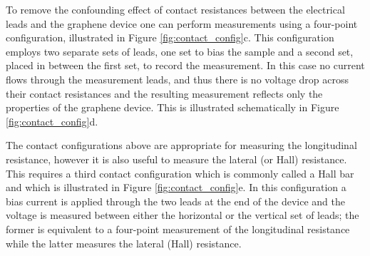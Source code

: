 \documentclass[edeposit,fullpage,draftthesis]{uiucthesis2009}
\begin{document}
            To remove the confounding effect of contact resistances between the electrical leads and the graphene
            device one can perform measurements using a four-point configuration, illustrated in
            Figure \ref{fig:contact_config}c. This configuration employs two separate sets of leads, one set to
            bias the sample and a second set, placed in between the first set, to record the measurement. 
            In this case no current flows through the measurement leads, and thus there is no voltage drop
            across their contact resistances and the resulting measurement reflects only the properties of 
            the graphene device. This is illustrated schematically in Figure \ref{fig:contact_config}d.
            
            The contact configurations above are appropriate for measuring the longitudinal resistance, however it 
            is also useful to measure the lateral (or Hall) resistance. This requires a third contact configuration
            which is commonly called a Hall bar and which is illustrated in Figure \ref{fig:contact_config}e.
            In this configuration a bias current is applied through the two leads at the end of the device
            and the voltage is measured between either the horizontal or the vertical set of leads; the former 
            is equivalent to a four-point measurement of the longitudinal resistance while the latter measures
            the lateral (Hall) resistance.
            
\end{document}
